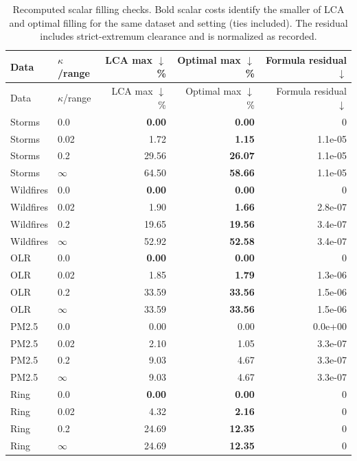 \begingroup\small\setlength{\tabcolsep}{4pt}
\begin{longtable}{llrrr}
\caption{Recomputed scalar filling checks. Bold scalar costs identify the smaller of LCA and optimal filling for the same dataset and setting (ties included). The residual includes strict-extremum clearance and is normalized as recorded.}\\\toprule
Data & $\kappa$/range & LCA max $\downarrow$ \% & Optimal max $\downarrow$ \% & Formula residual $\downarrow$\\\midrule\endfirsthead
\toprule Data & $\kappa$/range & LCA max $\downarrow$ \% & Optimal max $\downarrow$ \% & Formula residual $\downarrow$\\\midrule\endhead
\bottomrule\endfoot
Storms & 0.0 & \textbf{0.00} & \textbf{0.00} & 0\\
Storms & 0.02 & 1.72 & \textbf{1.15} & 1.1e-05\\
Storms & 0.2 & 29.56 & \textbf{26.07} & 1.1e-05\\
Storms & $\infty$ & 64.50 & \textbf{58.66} & 1.1e-05\\
Wildfires & 0.0 & \textbf{0.00} & \textbf{0.00} & 0\\
Wildfires & 0.02 & 1.90 & \textbf{1.66} & 2.8e-07\\
Wildfires & 0.2 & 19.65 & \textbf{19.56} & 3.4e-07\\
Wildfires & $\infty$ & 52.92 & \textbf{52.58} & 3.4e-07\\
OLR & 0.0 & \textbf{0.00} & \textbf{0.00} & 0\\
OLR & 0.02 & 1.85 & \textbf{1.79} & 1.3e-06\\
OLR & 0.2 & 33.59 & \textbf{33.56} & 1.5e-06\\
OLR & $\infty$ & 33.59 & \textbf{33.56} & 1.5e-06\\
PM2.5 & 0.0 & 0.00 & 0.00 & 0.0e+00\\
PM2.5 & 0.02 & 2.10 & 1.05 & 3.3e-07\\
PM2.5 & 0.2 & 9.03 & 4.67 & 3.3e-07\\
PM2.5 & $\infty$ & 9.03 & 4.67 & 3.3e-07\\
Ring & 0.0 & \textbf{0.00} & \textbf{0.00} & 0\\
Ring & 0.02 & 4.32 & \textbf{2.16} & 0\\
Ring & 0.2 & 24.69 & \textbf{12.35} & 0\\
Ring & $\infty$ & 24.69 & \textbf{12.35} & 0\\
\end{longtable}\endgroup

